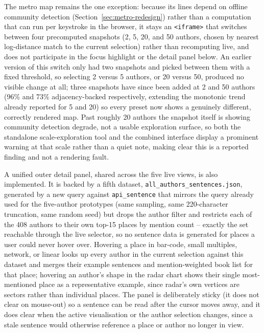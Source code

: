 \documentclass[logo,msc]{infthesis}
\begin{document}
The metro map remains the one exception: because its lines depend on offline community detection (Section~\ref{sec:metro-redesign}) rather than a computation that can run per keystroke in the browser, it stays an \texttt{<iframe>} that switches between four precomputed snapshots (2, 5, 20, and 50 authors, chosen by nearest log-distance match to the current selection) rather than recomputing live, and does not participate in the focus highlight or the detail panel below. An earlier version of this switch only had two snapshots and picked between them with a fixed threshold, so selecting 2 versus 5 authors, or 20 versus 50, produced no visible change at all; three snapshots have since been added at 2 and 50 authors (96\% and 73\% adjacency-backed respectively, extending the monotonic trend already reported for 5 and 20) so every preset now shows a genuinely different, correctly rendered map. Past roughly 20 authors the snapshot itself is showing community detection degrade, not a usable exploration surface, so both the standalone scale-exploration tool and the combined interface display a prominent warning at that scale rather than a quiet note, making clear this is a reported finding and not a rendering fault.

A unified outer detail panel, shared across the five live views, is also implemented. It is backed by a fifth dataset, \texttt{all\_authors\_sentences.json}, generated by a new query against \texttt{api\_sentence} that mirrors the query already used for the five-author prototypes (same sampling, same 220-character truncation, same random seed) but drops the author filter and restricts each of the 408 authors to their own top-15 places by mention count -- exactly the set reachable through the live selector, so no sentence data is generated for places a user could never hover over. Hovering a place in bar-code, small multiples, network, or linear looks up every author in the current selection against this dataset and merges their example sentences and mention-weighted book list for that place; hovering an author's shape in the radar chart shows their single most-mentioned place as a representative example, since radar's own vertices are sectors rather than individual places. The panel is deliberately sticky (it does not clear on mouse-out) so a sentence can be read after the cursor moves away, and it does clear when the active visualisation or the author selection changes, since a stale sentence would otherwise reference a place or author no longer in view.
\end{document}
